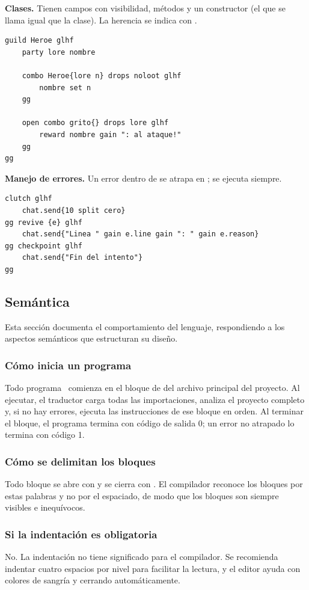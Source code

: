 \textbf{Clases.} Tienen campos con visibilidad, métodos y un constructor (el  que se llama igual que la clase). La herencia se indica con .
\begin{lstlisting}
guild Heroe glhf
    party lore nombre

    combo Heroe{lore n} drops noloot glhf
        nombre set n
    gg

    open combo grito{} drops lore glhf
        reward nombre gain ": al ataque!"
    gg
gg
\end{lstlisting}

\textbf{Manejo de errores.} Un error dentro de  se atrapa en ;  se ejecuta siempre.
\begin{lstlisting}
clutch glhf
    chat.send{10 split cero}
gg revive {e} glhf
    chat.send{"Linea " gain e.line gain ": " gain e.reason}
gg checkpoint glhf
    chat.send{"Fin del intento"}
gg
\end{lstlisting}

\subsection{Semántica}

Esta sección documenta el comportamiento del lenguaje, respondiendo a los aspectos semánticos que estructuran su diseño.

\subsubsection*{Cómo inicia un programa}
Todo programa \ggez\ comienza en el bloque de  del archivo principal del proyecto. Al ejecutar, el traductor carga todas las importaciones, analiza el proyecto completo y, si no hay errores, ejecuta las instrucciones de ese bloque en orden. Al terminar el bloque, el programa termina con código de salida 0; un error no atrapado lo termina con código 1.

\subsubsection*{Cómo se delimitan los bloques}
Todo bloque se abre con  y se cierra con . El compilador reconoce los bloques por estas palabras y no por el espaciado, de modo que los bloques son siempre visibles e inequívocos.

\subsubsection*{Si la indentación es obligatoria}
No. La indentación no tiene significado para el compilador. Se recomienda indentar cuatro espacios por nivel para facilitar la lectura, y el editor ayuda con colores de sangría y cerrando  automáticamente.

